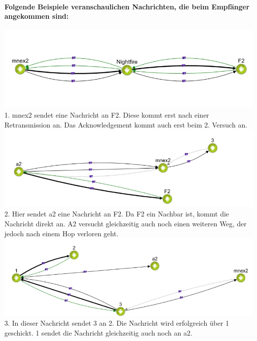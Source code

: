 \paragraph*{Folgende Beispiele veranschaulichen Nachrichten, die beim
Empfänger angekommen sind:}
\includegraphics[width=1.0\textwidth]{belege/grosstests/Bilder/Grosstest2/Test1Erfolg2.jpg}\\
1. mnex2 sendet eine Nachricht an F2. Diese kommt erst nach einer
Retransmission an. Das Acknowledgement kommt auch erst beim 2. Versuch
an.\\
\includegraphics[width=1.0\textwidth]{belege/grosstests/Bilder/Grosstest2/Test1Erfolg1.jpg}\\
2. Hier sendet a2 eine Nachricht an F2. Da F2 ein Nachbar ist, kommt die
Nachricht direkt an. A2 versucht gleichzeitig auch noch einen weiteren
Weg, der jedoch nach einem Hop verloren geht.\\
\includegraphics[width=1.0\textwidth]{belege/grosstests/Bilder/Grosstest2/Test1Erfolg3.jpg}\\
3. In dieser Nachricht sendet 3 an 2. Die Nachricht wird erfolgreich über 1
geschickt. 1 sendet die Nachricht gleichzeitig auch noch an a2.

